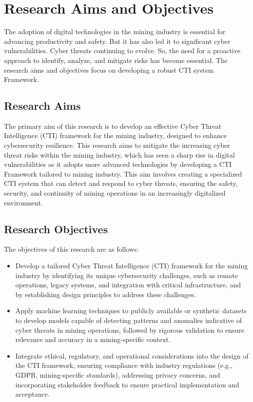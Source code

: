 \documentclass[a4paper,twoside,12pt]{report}
\begin{document}
\section{Research Aims and Objectives}
The adoption of digital technologies in the mining industry is essential for advancing productivity and safety. But it has also led it to significant cyber vulnerabilities. Cyber threats continuing to evolve. So, the need for a proactive approach to identify, analyze, and mitigate risks has become essential. The research aims and objectives focus on developing a robust CTI system Framework.\\
\subsection{Research Aims}
The primary aim of this research is to develop an effective Cyber Threat Intelligence (CTI) framework for the mining industry, designed to enhance cybersecurity resilience. This research aims to mitigate the increasing cyber threat risks within the mining industry, which has seen a sharp rise in digital vulnerabilities as it adopts more advanced technologies by developing a CTI Framework tailored to mining industry. This aim involves creating a specialized CTI system that can detect and respond to cyber threats, ensuring the safety, security, and continuity of mining operations in an increasingly digitalized environment.
\subsection{Research Objectives}

The objectives of this research are as follows:

\begin{itemize}
    \item Develop a tailored Cyber Threat Intelligence (CTI) framework for the mining industry by identifying its unique cybersecurity challenges, such as remote operations, legacy systems, and integration with critical infrastructure, and by establishing design principles to address these challenges.
    \item Apply machine learning techniques to publicly available or synthetic datasets to develop models capable of detecting patterns and anomalies indicative of cyber threats in mining operations, followed by rigorous validation to ensure relevance and accuracy in a mining-specific context.
    \item Integrate ethical, regulatory, and operational considerations into the design of the CTI framework, ensuring compliance with industry regulations (e.g., GDPR, mining-specific standards), addressing privacy concerns, and incorporating stakeholder feedback to ensure practical implementation and acceptance.
\end{itemize}
\end{document}
